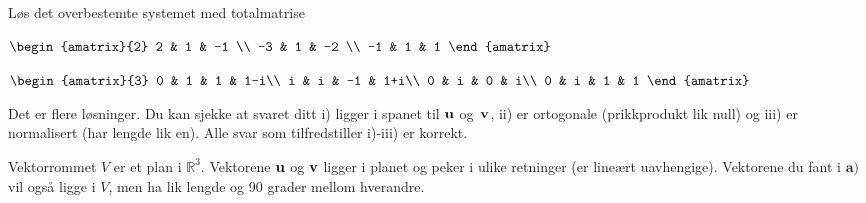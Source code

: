 \begin{oppgave}
Løs det overbestemte systemet med totalmatrise\\[2pt]
\begin{punkt}
$
\begin{amatrix}{2}
2 & 1 & -1 \\
-3 & 1 & -2 \\
 -1 & 1  & 1
\end{amatrix}\\[4pt]
$
\end{punkt}
\begin{punkt}
$
\begin{amatrix}{3}
0 & 1 & 1  & 1-i\\
i & i & -1 & 1+i\\
 0 & i  & 0 & i\\
  0 & i  & 1 & 1
\end{amatrix}\\[4pt]
$
\end{punkt}

\end{oppgave}

\begin{losning}

\begin{punkt}
Det er flere løsninger. Du kan sjekke at svaret ditt i) ligger i spanet til $\mathbf{u}$ og~$\mathbf{v}$, ii) er ortogonale (prikkprodukt lik null) og iii) er normalisert (har lengde lik en). Alle svar som tilfredstiller i)-iii) er korrekt.
\end{punkt}
\begin{punkt}
Vektorrommet $V$ er et plan i $\mathbb{R}^3$. Vektorene $\mathbf{u}$ og $\mathbf{v}$ ligger i planet og peker i ulike retninger (er lineært uavhengige). Vektorene du fant i $\textbf{a)}$ vil også ligge i $V$, men ha lik lengde og 90 grader mellom hverandre.
\end{punkt}

\end{losning}

\begin{losning}
\end{losning}

%

